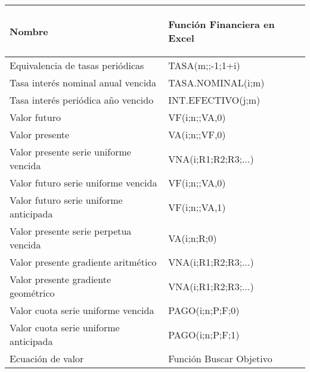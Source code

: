\begin{center}
 \begin{tabular}{ |p{8cm}| p{5cm}|}
  \hline
  \rowcolor{orange!50}
  \begin{center}\textbf{Nombre} \end{center}              & \begin{center} \textbf{Función Financiera en Excel} \end{center} \\ \hline

  Equivalencia de tasas periódicas       & TASA(m;;-1;1+i)           \\\hline

  Tasa interés nominal anual vencida     & TASA.NOMINAL(i;m)         \\ \hline

  Tasa interés periódica año vencido     & INT.EFECTIVO(j;m)         \\ \hline

  Valor futuro                           & VF(i;n;;VA,0)             \\ \hline

  Valor presente                         & VA(i;n;;VF,0)             \\ \hline

  Valor presente serie uniforme vencida  & VNA(i;R1;R2;R3;...)       \\ \hline

  Valor futuro serie uniforme vencida    & VF(i;n;;VA,0)             \\ \hline

  Valor futuro serie uniforme anticipada & VF(i;n;;VA,1)             \\ \hline

  Valor presente serie perpetua vencida  & VA(i;n;R;0)               \\ \hline

  Valor presente gradiente aritmético    & VNA(i;R1;R2;R3;...)       \\ \hline

  Valor presente gradiente geométrico    & VNA(i;R1;R2;R3;...)       \\ \hline

  Valor cuota serie uniforme vencida     & PAGO(i;n;P;F;0)           \\ \hline

  Valor cuota serie uniforme anticipada  & PAGO(i;n;P;F;1)           \\ \hline

  Ecuación de valor                      & Función Buscar Objetivo   \\ \hline
 \end{tabular}
\end{center}

